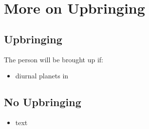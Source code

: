 \section{More on Upbringing}

\subsection{Upbringing}
The person will be brought up if:
\begin{itemize}[topsep=0pt,itemsep=0pt]
\item diurnal planets in 
\end{itemize}

\subsection{No Upbringing}
\begin{itemize}[topsep=0pt,itemsep=0pt]
\item text
\end{itemize}
